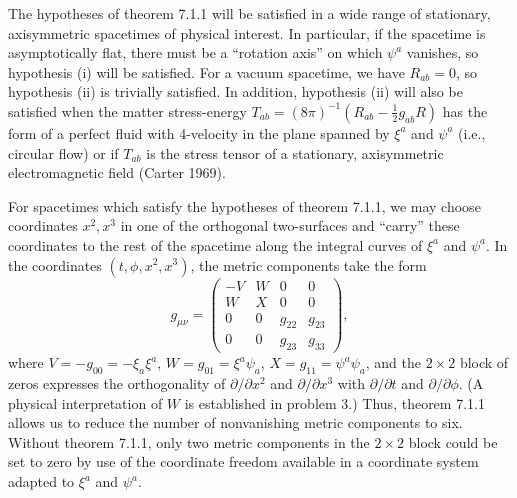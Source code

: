 The hypotheses of theorem 7.1.1 will be satisfied in a wide range of stationary,
axisymmetric spacetimes of physical interest. In particular, if the spacetime is
asymptotically flat, there must be a ``rotation axis'' on which \(\psi^a\) vanishes,
so hypothesis (i) will be satisfied. For a vacuum spacetime, we have \(R_{ab}=0\),
so hypothesis (ii) is trivially satisfied. In addition, hypothesis (ii) will also be
satisfied when the matter stress-energy
\(T_{ab}=(8\pi)^{-1}(R_{ab}-\tfrac12g_{ab}R)\) has the form of a perfect fluid
with 4-velocity in the plane spanned by \(\xi^a\) and \(\psi^a\) (i.e., circular
flow) or if \(T_{ab}\) is the stress tensor of a stationary, axisymmetric
electromagnetic field (Carter 1969).

For spacetimes which satisfy the hypotheses of theorem 7.1.1, we may choose
coordinates \(x^2,x^3\) in one of the orthogonal two-surfaces and ``carry'' these
coordinates to the rest of the spacetime along the integral curves of \(\xi^a\) and
\(\psi^a\). In the coordinates \((t,\phi,x^2,x^3)\), the metric components take the
form
\begin{equation}
  g_{\mu\nu}=
  \begin{pmatrix}
    -V&W&0&0\\
    W&X&0&0\\
    0&0&g_{22}&g_{23}\\
    0&0&g_{23}&g_{33}
  \end{pmatrix} ,
  \tag{7.1.17}\label{eq:7.1.17}
\end{equation}
where \(V=-g_{00}=-\xi_a\xi^a\), \(W=g_{01}=\xi^a\psi_a\),
\(X=g_{11}=\psi^a\psi_a\), and the \(2\times2\) block of zeros expresses the
orthogonality of \(\partial/\partial x^2\) and \(\partial/\partial x^3\) with
\(\partial/\partial t\) and \(\partial/\partial\phi\). (A physical interpretation of
\(W\) is established in problem 3.) Thus, theorem 7.1.1 allows us to reduce the
number of nonvanishing metric components to six. Without theorem 7.1.1, only two
metric components in the \(2\times2\) block could be set to zero by use of the
coordinate freedom available in a coordinate system adapted to \(\xi^a\) and
\(\psi^a\).

